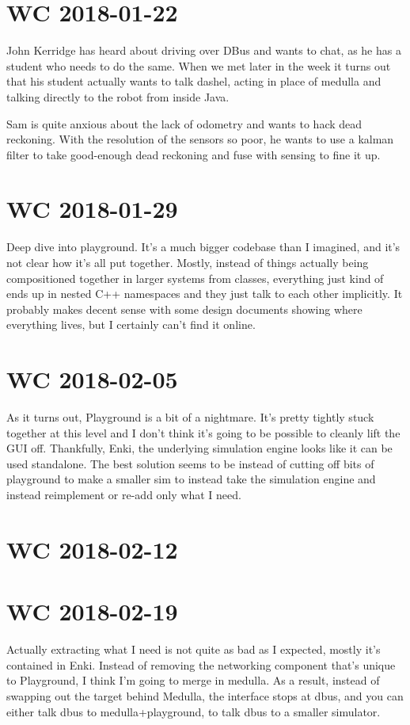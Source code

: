 \documentclass[a4paper]{article}
\begin{document}
\section{WC 2018-01-22}
    John Kerridge has heard about driving over DBus and wants to chat, as he has a student who needs to do the same.
    When we met later in the week it turns out that his student actually wants to talk dashel, acting in place of
    medulla and talking directly to the robot from inside Java.

    Sam is quite anxious about the lack of odometry and wants to hack dead reckoning. With the resolution of the sensors
    so poor, he wants to use a kalman filter to take good-enough dead reckoning and fuse with sensing to fine it up.
\section{WC 2018-01-29}
    Deep dive into playground. It's a much bigger codebase than I imagined, and it's not clear how it's all put
    together. Mostly, instead of things actually being compositioned together in larger systems from classes, everything
    just kind of ends up in nested C++ namespaces and they just talk to each other implicitly. It probably makes decent
    sense with some design documents showing where everything lives, but I certainly can't find it online.
\section{WC 2018-02-05}
    As it turns out, Playground is a bit of a nightmare. It's pretty tightly stuck together at this level and I don't
    think it's going to be possible to cleanly lift the GUI off. Thankfully, Enki, the underlying simulation engine
    looks like it can be used standalone. The best solution seems to be instead of cutting off bits of playground to
    make a smaller sim to instead take the simulation engine and instead reimplement or re-add only what I need.
\section{WC 2018-02-12}
\section{WC 2018-02-19}
    Actually extracting what I need is not quite as bad as I expected, mostly it's contained in Enki. Instead of
    removing the networking component that's unique to Playground, I think I'm going to merge in medulla. As a result,
    instead of swapping out the target behind Medulla, the interface stops at dbus, and you can either talk dbus to
    medulla+playground, to talk dbus to a smaller simulator.
\end{document}
